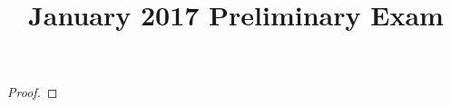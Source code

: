 \documentclass[11pt,twoside]{amsart}
\title{January 2017 Preliminary Exam}
\author{}
\theoremstyle{plain}
\begin{document}
\maketitle

\begin{proof}
\end{proof}
\end{document}
